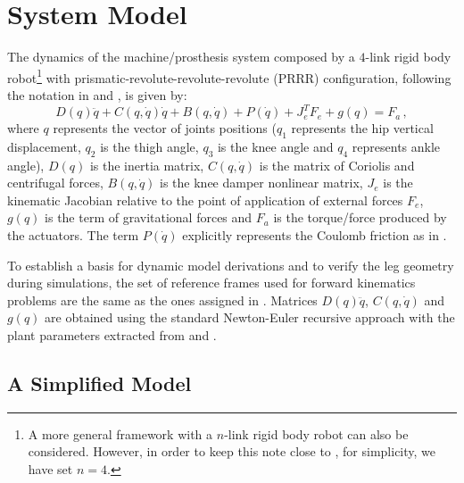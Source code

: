 \documentclass[letterpaper, 10 pt, conference]{ieeeconf}  %
\theoremstyle{plain}
\theoremstyle{definition}
\theoremstyle{remark}
\begin{document}



\section{System Model}
\label{sec:System_model}

The dynamics of the machine/prosthesis system composed by a $4$-link rigid body robot\footnote{A more general framework with a $n$-link rigid body robot can also be considered. However, in order to keep this note close to \cite{Richter2015}, for simplicity, we have set $n=4$.} with prismatic-revolute-revolute-revolute (PRRR) configuration, following the notation in \cite{Richter2015} and \cite{Fakoorian2016}, is given by:
%
\begin{equation}
D(q)\ddot{q} + C(q,\dot{q})\dot{q}+B(q,\dot{q}) + P(\dot{q}) + J_e^T F_e+g(q) = F_a\,,
\label{eq:Dinamica}
\end{equation}
%
where  $q$ represents the vector of joints positions ($q_1$ represents the hip vertical displacement, $q_2$ is the thigh angle, $q_3$ is the knee angle and $q_4$ represents ankle angle), $D(q)$ is the inertia matrix, $C(q,\dot{q})$ is the matrix of Coriolis and centrifugal forces, $B(q,\dot{q})$ is the knee  damper nonlinear matrix, $J_e$ is the kinematic Jacobian relative to the point of application of external forces $F_e$, $g(q)$ is the term of gravitational forces and $F_a$ is the torque/force produced by the actuators. The term  $P(\dot{q})$ explicitly represents the Coulomb friction as in \cite{LeeKhalil2015}. %

To establish a basis for dynamic model derivations and to verify the leg geometry during simulations, the set of reference frames used for forward kinematics problems are the same as the ones assigned in \cite{Richter2015}. Matrices $D(q)\ddot{q}$, $C(q,\dot{q})$ and $g(q)$ are obtained using the standard Newton-Euler recursive approach with the plant parameters extracted from \cite{Richter2015} and \cite{Fakoorian2016}.

\subsection{A Simplified Model}
\end{document}
